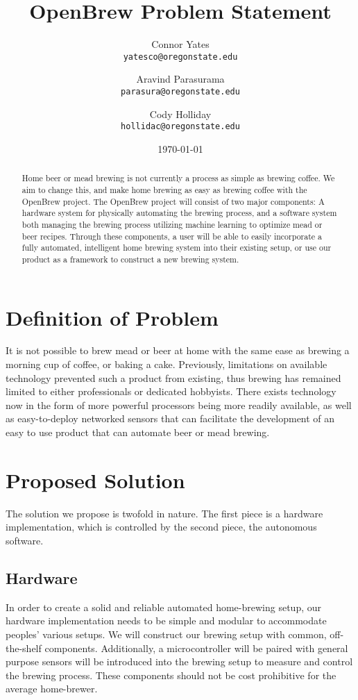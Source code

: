 \documentclass[letterpaper,10pt]{article}
\author{Connor Yates\\
\texttt{yatesco@oregonstate.edu}
\and
Aravind Parasurama\\
\texttt{parasura@oregonstate.edu}
\and
Cody Holliday\\
\texttt{hollidac@oregonstate.edu}}
\date{\today}
\title{OpenBrew Problem Statement}
\begin{document}
\maketitle

\begin{abstract}
	Home beer or mead brewing is not currently a process as simple as brewing
	coffee. We aim to change this, and make home brewing as easy as brewing coffee with the
	OpenBrew project. The OpenBrew project will consist of two major components: A
	hardware system for physically automating the brewing process, and a software system 
	both managing the brewing process utilizing machine learning to optimize mead or beer 
	recipes. Through these components, a user will be able to easily incorporate a fully 
	automated, intelligent home brewing system into their existing setup, or use our 
	product as a framework to construct a new brewing system.
\end{abstract}

\newpage

\section{Definition of Problem}
It is not possible to brew mead or beer at home with the same ease as brewing a morning cup of
coffee, or baking a cake. Previously, limitations on available technology prevented such
a product from existing, thus brewing has remained limited to either professionals or
dedicated hobbyists. There exists technology now in the form of more powerful processors
being more readily available, as well as easy-to-deploy networked sensors that can facilitate
the development of an easy to use product that can automate beer or mead brewing.

\section{Proposed Solution}
The solution we propose is twofold in nature.
The first piece is a hardware implementation, which is controlled by the second piece, 
the autonomous software.

\subsection{Hardware}
In order to create a solid and reliable automated home-brewing setup, our hardware 
implementation needs to be simple and modular to accommodate peoples' various setups.
We will construct our brewing setup with common, off-the-shelf components.
Additionally, a microcontroller will be paired with general purpose sensors will be 
introduced into the brewing setup to measure and control the brewing process.
These components should not be cost prohibitive for the average home-brewer.
\end{document}
